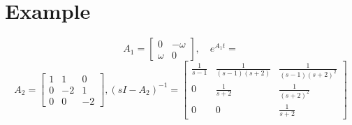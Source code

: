 \documentclass[10pt,a4paper,oneside]{article}
\begin{document}
\section{Example}
\[
A_{1}=\left[\begin{array}{cc}{0} & {-\omega} \\ {\omega} & {0}\end{array}\right], \quad e^{A_{1} t}=
\]
\[
A_{2}=\left[\begin{array}{ccc}{1} & {1} & {0} \\ {0} & {-2} & {1} \\ {0} & {0} & {-2}\end{array}\right],\left(sI-A_{2}\right)^{-1}=\left[\begin{array}{ccc}{\frac{1}{s-1}} & {\frac{1}{(s-1)(s+2)}}&{\frac{1}{(s-1)(s+2)^{2}}} \\ {0} & {\frac{1}{s+2}}&  {\frac{1}{(s+2)^2}} \\ {0} & {0}& {\frac{1}{s+2}} \end{array}\right]
\]
\end{document}
